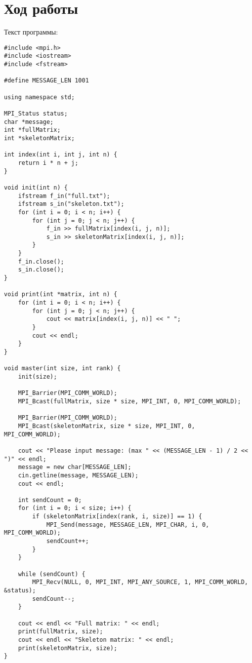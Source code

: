 \documentclass[a4paper,14pt]{extarticle}
\begin{document}
\section{Ход работы}
Текст программы:
\begin{lstlisting}
#include <mpi.h> 
#include <iostream> 
#include <fstream> 
  
#define MESSAGE_LEN 1001 
  
using namespace std; 
  
MPI_Status status; 
char *message; 
int *fullMatrix; 
int *skeletonMatrix; 
  
int index(int i, int j, int n) { 
    return i * n + j; 
} 
  
void init(int n) { 
    ifstream f_in("full.txt"); 
    ifstream s_in("skeleton.txt"); 
    for (int i = 0; i < n; i++) { 
        for (int j = 0; j < n; j++) { 
            f_in >> fullMatrix[index(i, j, n)]; 
            s_in >> skeletonMatrix[index(i, j, n)]; 
        } 
    } 
    f_in.close(); 
    s_in.close(); 
} 
  
void print(int *matrix, int n) { 
    for (int i = 0; i < n; i++) { 
        for (int j = 0; j < n; j++) { 
            cout << matrix[index(i, j, n)] << " "; 
        } 
        cout << endl; 
    } 
} 
  
void master(int size, int rank) { 
    init(size); 
  
    MPI_Barrier(MPI_COMM_WORLD); 
    MPI_Bcast(fullMatrix, size * size, MPI_INT, 0, MPI_COMM_WORLD); 
  
    MPI_Barrier(MPI_COMM_WORLD); 
    MPI_Bcast(skeletonMatrix, size * size, MPI_INT, 0, MPI_COMM_WORLD); 
  
    cout << "Please input message: (max " << (MESSAGE_LEN - 1) / 2 << ")" << endl; 
    message = new char[MESSAGE_LEN]; 
    cin.getline(message, MESSAGE_LEN); 
    cout << endl; 
  
    int sendCount = 0; 
    for (int i = 0; i < size; i++) { 
        if (skeletonMatrix[index(rank, i, size)] == 1) { 
            MPI_Send(message, MESSAGE_LEN, MPI_CHAR, i, 0, MPI_COMM_WORLD); 
            sendCount++; 
        } 
    } 
  
    while (sendCount) { 
        MPI_Recv(NULL, 0, MPI_INT, MPI_ANY_SOURCE, 1, MPI_COMM_WORLD, &status); 
        sendCount--; 
    } 
  
    cout << endl << "Full matrix: " << endl; 
    print(fullMatrix, size); 
    cout << endl << "Skeleton matrix: " << endl; 
    print(skeletonMatrix, size); 
} 
  

\end{lstlisting}
\end{document}
